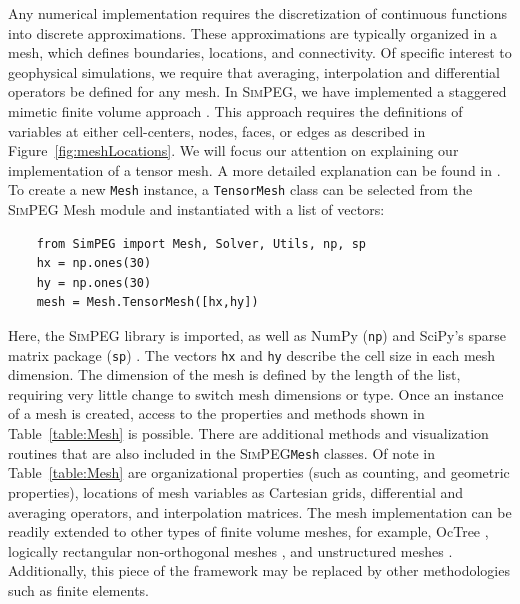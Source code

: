 \documentclass[preprint,review,3p,times,onecolumn,authoryear]{elsarticle}
\newcommand{\SimPEG}{\textsc{SimPEG}\xspace}
\newcommand{\Mesh}{\texttt{Mesh}\xspace}
\begin{document}
Any numerical implementation requires the discretization of continuous
functions into discrete approximations. These approximations are typically
organized in a mesh, which defines boundaries, locations, and
connectivity. Of specific interest to geophysical simulations, we require
that averaging, interpolation and differential operators be defined for
any mesh. In \SimPEG, we have implemented a staggered mimetic finite
volume approach \citep{Hyman1999,Hyman2002}. This approach requires the definitions of
variables at either cell-centers, nodes, faces, or edges as described in
Figure~\ref{fig:meshLocations}. We will focus our attention on explaining
our implementation of a tensor mesh. A more detailed explanation can be
found in \cite{haber2015computational}.
To create a new \Mesh instance, a \texttt{TensorMesh} class can be selected from the
\SimPEG Mesh module and instantiated with a list of vectors:

{%
{\scriptsize\begin{verbatim}
    from SimPEG import Mesh, Solver, Utils, np, sp
    hx = np.ones(30)
    hy = np.ones(30)
    mesh = Mesh.TensorMesh([hx,hy])
\end{verbatim}}
}
\noindent
Here, the \SimPEG library is imported, as well as NumPy (\texttt{np}) and SciPy's sparse
matrix package (\texttt{sp}) \citep{scipyOliphant,scipy}. The vectors \texttt{hx} and \texttt{hy} describe the cell size in each mesh dimension. The dimension of the mesh is defined by the length of the list, requiring very little change to switch mesh dimensions or type.
Once an instance of a mesh is created, access to the properties and methods shown in
Table~\ref{table:Mesh} is possible. There are additional methods and visualization routines that are also included in the \SimPEG \Mesh classes.
Of note in Table~\ref{table:Mesh} are
organizational properties (such as counting, and geometric properties),
locations of mesh variables as Cartesian grids,
differential and averaging operators,
and interpolation matrices.
The mesh implementation can be readily extended to
other types of finite volume meshes, for example, OcTree \citep{HaHe06}, logically
rectangular non-orthogonal meshes \citep{Hyman2002}, and unstructured meshes \citep{Ollivier-gooch2002}.
Additionally, this piece of the framework
may be replaced by other methodologies such as finite elements.
\end{document}
